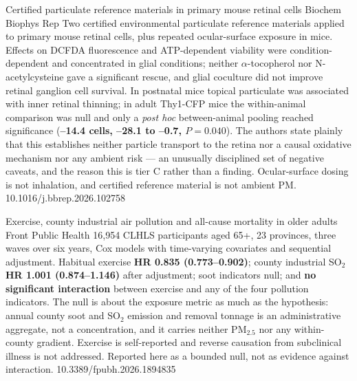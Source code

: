 \documentclass[10pt]{article}
\begin{document}
{Certified particulate reference materials in primary mouse retinal cells}
{Biochem Biophys Rep}
{Two certified environmental particulate reference materials applied to primary mouse
retinal cells, plus repeated ocular-surface exposure in mice. Effects on DCFDA fluorescence
and ATP-dependent viability were condition-dependent and concentrated in glial conditions;
neither $\alpha$-tocopherol nor N-acetylcysteine gave a significant rescue, and glial
coculture did not improve retinal ganglion cell survival. In postnatal mice topical
particulate was associated with inner retinal thinning; in adult Thy1-CFP mice the
within-animal comparison was null and only a \emph{post hoc} between-animal pooling reached
significance (\textbf{--14.4 cells, --28.1 to --0.7, $P=0.040$}). The authors state plainly
that this establishes neither particle transport to the retina nor a causal oxidative
mechanism nor any ambient risk --- an unusually disciplined set of negative caveats, and the
reason this is tier C rather than a finding. Ocular-surface dosing is not inhalation, and
certified reference material is not ambient PM.}
{10.1016/j.bbrep.2026.102758}


{Exercise, county industrial air pollution and all-cause mortality in older adults}
{Front Public Health}
{16{,}954 CLHLS participants aged 65+, 23 provinces, three waves over six years, Cox models
with time-varying covariates and sequential adjustment. Habitual exercise
\textbf{HR 0.835 (0.773--0.902)}; county industrial SO$_2$ \textbf{HR 1.001 (0.874--1.146)}
after adjustment; soot indicators null; and \textbf{no significant interaction} between
exercise and any of the four pollution indicators. The null is about the exposure metric as
much as the hypothesis: annual county soot and SO$_2$ emission and removal tonnage is an
administrative aggregate, not a concentration, and it carries neither PM$_{2.5}$ nor any
within-county gradient. Exercise is self-reported and reverse causation from subclinical
illness is not addressed. Reported here as a bounded null, not as evidence against
interaction.}
{10.3389/fpubh.2026.1894835}
\end{document}
